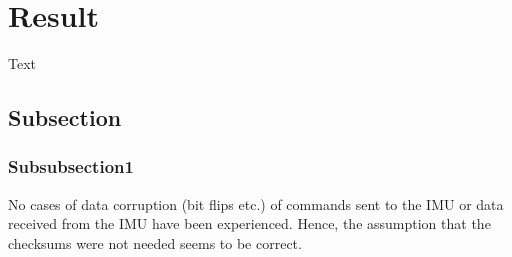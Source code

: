 
\section{Result}\label{sec:result}
Text

\subsection{Subsection}


\subsubsection{Subsubsection1}


No cases of data corruption (bit flips etc.) of commands sent to the IMU or data received from the IMU have been experienced. Hence, the assumption that the checksums were not needed seems to be correct.